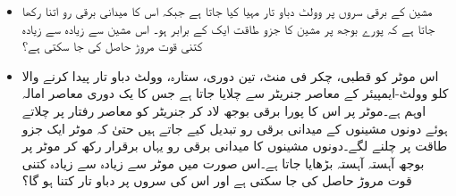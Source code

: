 \begin{itemize}
\item
مشین کے برقی سروں پر  وولٹ دباو تار مہیا کیا جاتا ہے جبکہ اس کا میدانی برقی رو اتنا رکھا جاتا ہے کہ پورے بوجھ پر مشین کا جزو طاقت ایک کے برابر ہو۔ اس مشین سے زیادہ سے زیادہ کتنی قوت مروڑ حاصل کی جا سکتی ہے؟
\item
اس موٹر کو    قطبی،   چکر فی منٹ، تین دوری، ستارہ،   وولٹ دباو تار پیدا کرنے والا   کلو وولٹ-ایمپیئر کے معاصر جنریٹر سے چلایا جاتا ہے جس کا یک دوری معاصر امالہ  اوہم ہے۔موٹر پر اس کا پورا برقی بوجھ لاد  کر جنریٹر کو معاصر رفتار پر چلاتے ہوئے دونوں مشینوں کے میدانی برقی رو تبدیل کیے جاتے ہیں حتیٰ کہ موٹر ایک جزو طاقت پر چلنے لگے۔دونوں مشینوں کا میدانی برقی رو یہاں برقرار رکھ کر موٹر پر بوجھ آہستہ آہستہ بڑھایا جاتا ہے۔اس صورت میں موٹر سے زیادہ سے زیادہ کتنی قوت مروڑ  حاصل کی جا سکتی ہے اور اس کی سروں پر دباو تار کتنا ہو گا؟ 
\end{itemize}

